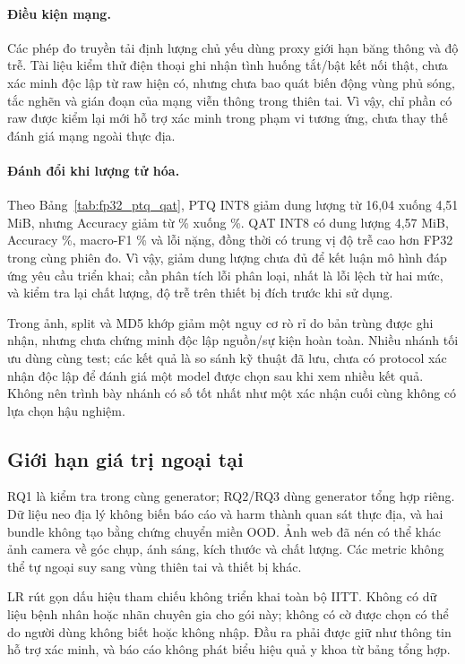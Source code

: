 \paragraph{Điều kiện mạng.}
Các phép đo truyền tải định lượng chủ yếu dùng proxy giới hạn băng thông và độ trễ. Tài liệu kiểm thử điện thoại ghi nhận tình huống tắt/bật kết nối thật, chưa xác minh độc lập từ raw hiện có, nhưng chưa bao quát biến động vùng phủ sóng, tắc nghẽn và gián đoạn của mạng viễn thông trong thiên tai. Vì vậy, chỉ phần có raw được kiểm lại mới hỗ trợ xác minh trong phạm vi tương ứng, chưa thay thế đánh giá mạng ngoài thực địa.

\paragraph{Đánh đổi khi lượng tử hóa.}
Theo Bảng~\ref{tab:fp32_ptq_qat}, PTQ INT8 giảm dung lượng từ 16,04 xuống 4,51 MiB, nhưng Accuracy giảm từ \NewImageAccuracy\% xuống \PTQAccuracy\%. QAT INT8 có dung lượng 4,57 MiB, Accuracy \QATAccuracy\%, macro-F1 \QATMacroFOne\% và \QATCriticalCount{} lỗi nặng, đồng thời có trung vị độ trễ cao hơn FP32 trong cùng phiên đo. Vì vậy, giảm dung lượng chưa đủ để kết luận mô hình đáp ứng yêu cầu triển khai; cần phân tích lỗi phân loại, nhất là lỗi lệch từ hai mức, và kiểm tra lại chất lượng, độ trễ trên thiết bị đích trước khi sử dụng.

Trong ảnh, split và MD5 khớp giảm một nguy cơ rò rỉ do bản trùng được ghi nhận, nhưng chưa chứng minh độc lập nguồn/sự kiện hoàn toàn. Nhiều nhánh tối ưu dùng cùng test; các kết quả là so sánh kỹ thuật đã lưu, chưa có protocol xác nhận độc lập để đánh giá một model được chọn sau khi xem nhiều kết quả. Không nên trình bày nhánh có số tốt nhất như một xác nhận cuối cùng không có lựa chọn hậu nghiệm.

\subsection{Giới hạn giá trị ngoại tại}
RQ1 là kiểm tra trong cùng generator; RQ2/RQ3 dùng generator tổng hợp riêng. Dữ liệu neo địa lý không biến báo cáo và harm thành quan sát thực địa, và hai bundle không tạo bằng chứng chuyển miền OOD. Ảnh web đã nén có thể khác ảnh camera về góc chụp, ánh sáng, kích thước và chất lượng. Các metric không thể tự ngoại suy sang vùng thiên tai và thiết bị khác.

LR rút gọn dấu hiệu tham chiếu không triển khai toàn bộ IITT. Không có dữ liệu bệnh nhân hoặc nhãn chuyên gia cho gói này; không có cờ được chọn có thể do người dùng không biết hoặc không nhập. Đầu ra phải được giữ như thông tin hỗ trợ xác minh, và báo cáo không phát biểu hiệu quả y khoa từ bảng tổng hợp.

